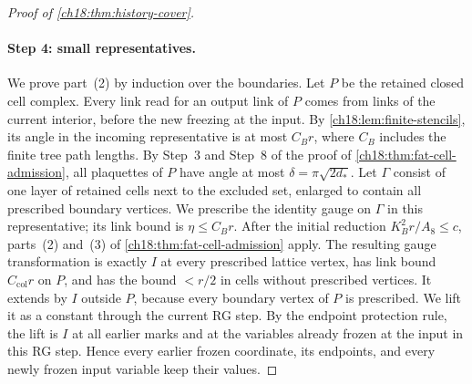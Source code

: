 \begin{proof}[Proof of \cref{ch18:thm:history-cover}]
\paragraph{Step 4: small representatives.}
We prove part~(2) by induction over the boundaries. Let $P$ be the retained closed cell complex. Every link read for an output link of $P$ comes from links of the current interior, before the new freezing at the input. By \cref{ch18:lem:finite-stencils}, its angle in the incoming representative is at most $C_Br$, where $C_B$ includes the finite tree path lengths. By Step~3 and Step~8 of the proof of \cref{ch18:thm:fat-cell-admission}, all plaquettes of $P$ have angle at most $\delta=\pi\sqrt{2d_*}$. Let $\Gamma$ consist of one layer of retained cells next to the excluded set, enlarged to contain all prescribed boundary vertices. We prescribe the identity gauge on $\Gamma$ in this representative; its link bound is $\eta\le C_Br$. After the initial reduction $K_B^2r/A_8\le c$, parts~(2) and~(3) of \cref{ch18:thm:fat-cell-admission} apply. The resulting gauge transformation is exactly $I$ at every prescribed lattice vertex, has link bound $C_{\mathrm{col}}r$ on $P$, and has the bound $<r/2$ in cells without prescribed vertices. It extends by $I$ outside $P$, because every boundary vertex of $P$ is prescribed. We lift it as a constant through the current RG step. By the endpoint protection rule, the lift is $I$ at all earlier marks and at the variables already frozen at the input in this RG step. Hence every earlier frozen coordinate, its endpoints, and every newly frozen input variable keep their values.


\end{proof}
